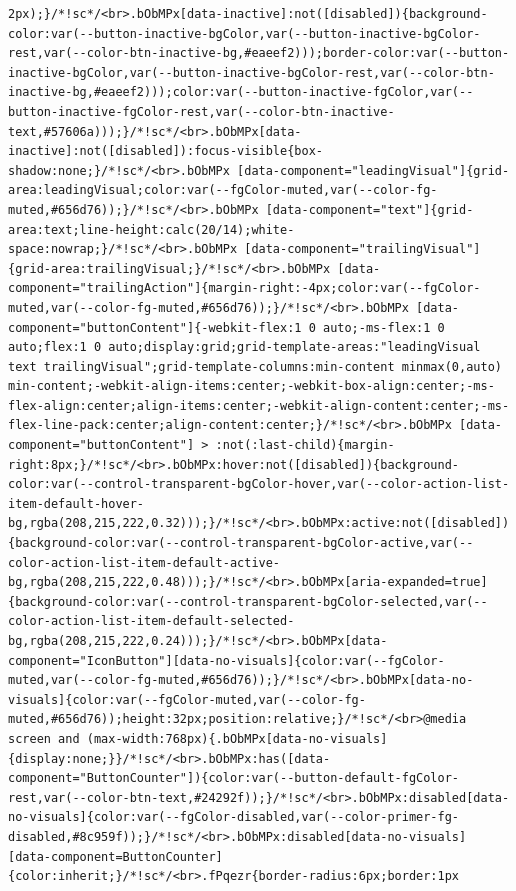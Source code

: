 \documentclass[
  letterpaper,
]{book}
\begin{document}
\begin{verbatim}
2px);}/*!sc*/<br>.bObMPx[data-inactive]:not([disabled]){background-color:var(--button-inactive-bgColor,var(--button-inactive-bgColor-rest,var(--color-btn-inactive-bg,#eaeef2)));border-color:var(--button-inactive-bgColor,var(--button-inactive-bgColor-rest,var(--color-btn-inactive-bg,#eaeef2)));color:var(--button-inactive-fgColor,var(--button-inactive-fgColor-rest,var(--color-btn-inactive-text,#57606a)));}/*!sc*/<br>.bObMPx[data-inactive]:not([disabled]):focus-visible{box-shadow:none;}/*!sc*/<br>.bObMPx [data-component="leadingVisual"]{grid-area:leadingVisual;color:var(--fgColor-muted,var(--color-fg-muted,#656d76));}/*!sc*/<br>.bObMPx [data-component="text"]{grid-area:text;line-height:calc(20/14);white-space:nowrap;}/*!sc*/<br>.bObMPx [data-component="trailingVisual"]{grid-area:trailingVisual;}/*!sc*/<br>.bObMPx [data-component="trailingAction"]{margin-right:-4px;color:var(--fgColor-muted,var(--color-fg-muted,#656d76));}/*!sc*/<br>.bObMPx [data-component="buttonContent"]{-webkit-flex:1 0 auto;-ms-flex:1 0 auto;flex:1 0 auto;display:grid;grid-template-areas:"leadingVisual text trailingVisual";grid-template-columns:min-content minmax(0,auto) min-content;-webkit-align-items:center;-webkit-box-align:center;-ms-flex-align:center;align-items:center;-webkit-align-content:center;-ms-flex-line-pack:center;align-content:center;}/*!sc*/<br>.bObMPx [data-component="buttonContent"] > :not(:last-child){margin-right:8px;}/*!sc*/<br>.bObMPx:hover:not([disabled]){background-color:var(--control-transparent-bgColor-hover,var(--color-action-list-item-default-hover-bg,rgba(208,215,222,0.32)));}/*!sc*/<br>.bObMPx:active:not([disabled]){background-color:var(--control-transparent-bgColor-active,var(--color-action-list-item-default-active-bg,rgba(208,215,222,0.48)));}/*!sc*/<br>.bObMPx[aria-expanded=true]{background-color:var(--control-transparent-bgColor-selected,var(--color-action-list-item-default-selected-bg,rgba(208,215,222,0.24)));}/*!sc*/<br>.bObMPx[data-component="IconButton"][data-no-visuals]{color:var(--fgColor-muted,var(--color-fg-muted,#656d76));}/*!sc*/<br>.bObMPx[data-no-visuals]{color:var(--fgColor-muted,var(--color-fg-muted,#656d76));height:32px;position:relative;}/*!sc*/<br>@media screen and (max-width:768px){.bObMPx[data-no-visuals]{display:none;}}/*!sc*/<br>.bObMPx:has([data-component="ButtonCounter"]){color:var(--button-default-fgColor-rest,var(--color-btn-text,#24292f));}/*!sc*/<br>.bObMPx:disabled[data-no-visuals]{color:var(--fgColor-disabled,var(--color-primer-fg-disabled,#8c959f));}/*!sc*/<br>.bObMPx:disabled[data-no-visuals] [data-component=ButtonCounter]{color:inherit;}/*!sc*/<br>.fPqezr{border-radius:6px;border:1px 
\end{verbatim}
\end{document}
